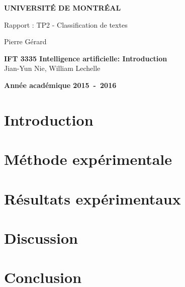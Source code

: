 \documentclass[a4paper,10pt]{article}
\begin{document}
\begin{titlepage}
\begin{center}
\textbf{\textsc{UNIVERSIT\'E DE MONTR\'EAL}}\\
\vfill{}\vfill{}
\begin{center}{\Huge Rapport : TP2 - Classification de textes}\end{center}{\Huge \par}
\begin{center}{\large Pierre Gérard}\end{center}{\Huge \par}
\vfill{}\vfill{} \vfill{}
\begin{center}{\large \textbf{IFT 3335 Intelligence artificielle: Introduction}}\hfill{\\Jian-Yun Nie, William Lechelle}\end{center}{\large\par}
\vfill{}\vfill{}\enlargethispage{3cm}
\textbf{Année académique 2015~-~2016}
\end{center}
\end{titlepage}



\tableofcontents

\pagebreak

\section{Introduction}


\section{Méthode expérimentale}

\section{Résultats expérimentaux}

\section{Discussion}

\section{Conclusion}
\end{document}
